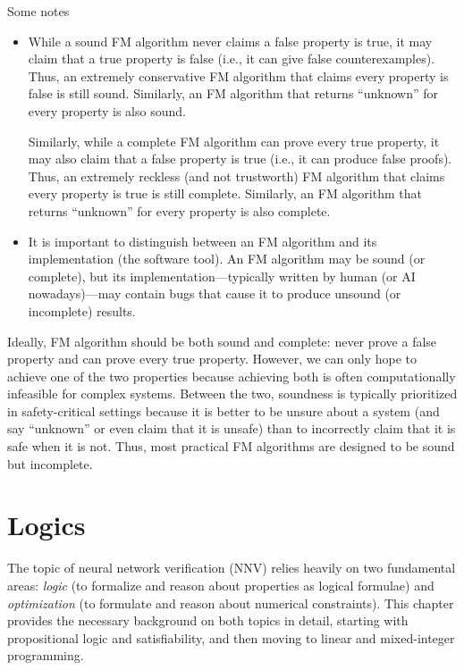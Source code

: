 \documentclass[oneside,11pt,dvipsnames]{book}
\numberwithin{equation}{section}
\theoremstyle{definition}
\theoremstyle{remark}
\begin{document}
Some notes
\begin{itemize}
    \item While a sound FM algorithm never claims a false property is true, it may claim that a true property is false (i.e., it can give false counterexamples). Thus, an extremely conservative FM algorithm that claims every property is false is still sound. Similarly, an FM algorithm that returns ``unknown'' for every property is also sound. 
    
    Similarly, while a complete FM algorithm can prove every true property, it may also claim that a false property is true (i.e., it can produce false proofs). Thus, an extremely reckless (and not trustworth) FM algorithm that claims every property is true is still complete. Similarly, an FM algorithm that returns ``unknown'' for every property is also complete. 

    \item It is important to distinguish between an FM algorithm and its implementation (the software tool). An FM algorithm may be sound (or complete), but its implementation---typically written by human (or AI nowadays)---may contain bugs that cause it to produce unsound (or incomplete) results. 
\end{itemize}



Ideally, FM algorithm should be both sound and complete: never prove a false property and can prove every true property. However,  we can only hope to achieve one of the two properties because achieving both is often computationally infeasible for complex systems. Between the two, soundness is typically prioritized in safety-critical settings because it is better to be unsure about a system (and say ``unknown'' or even claim that it is unsafe) than to incorrectly claim that it is safe when it is not. Thus, most practical FM algorithms are designed to be sound but incomplete.

\chapter{Logics}\label{chap:logics}

The topic of neural network verification (NNV) relies heavily on two fundamental areas: 
\emph{logic} (to formalize and reason about properties as logical formulae) and \emph{optimization} (to formulate and reason about numerical constraints).
This chapter provides the necessary background on both topics in detail, starting with propositional logic and satisfiability, and then moving to linear and mixed-integer programming.
\end{document}
